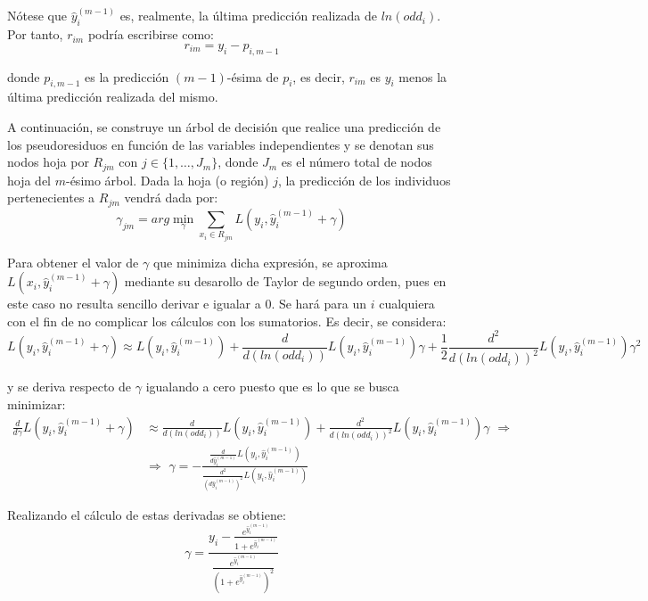 \documentclass[12pt,twoside]{article}
\begin{document}
Nótese que $\hat{y}_i^{(m-1)}$ es, realmente, la última predicción realizada de $ln(odd_i)$. Por tanto, $r_{im}$ podría escribirse como:
\begin{equation*}
r_{im} = y_i - p_{i, m-1}
\end{equation*}

\noindent
donde $p_{i, m-1}$ es la predicción $(m-1)$-ésima de $p_i$, es decir, $r_{im}$ es $y_i$ menos la última predicción realizada del mismo.

A continuación, se construye un árbol de decisión que realice una predicción de los pseudoresiduos en función de las variables independientes y se denotan sus nodos hoja por $R_{jm}$ con $j \in \{1, \dots, J_m \}$, donde $J_m$ es el número total de nodos hoja del $m$-ésimo árbol. Dada la hoja (o región) $j$, la predicción de los individuos pertenecientes a $R_{jm}$ vendrá dada por:
\begin{equation*}
\gamma_{jm} = arg\min_{\gamma} \sum_{x_i \in R_{jm}} L(y_i, \hat{y}_i^{(m-1)} + \gamma)
\end{equation*}

Para obtener el valor de $\gamma$ que minimiza dicha expresión, se aproxima $L(x_i, \hat{y}_i^{(m-1)} + \gamma)$ mediante su desarollo de Taylor de segundo orden, pues en este caso no resulta sencillo derivar e igualar a $0$. Se hará para un $i$ cualquiera con el fin de no complicar los cálculos con los sumatorios. Es decir, se considera:
\begin{equation*}
L(y_i, \hat{y}_i^{(m-1)} + \gamma) \approx L(y_i, \hat{y}_i^{(m-1)}) + \frac{d}{d(ln(odd_i))}L(y_i, \hat{y}_i^{(m-1)})\gamma + \frac{1}{2}\frac{d^2}{d(ln(odd_i))^2}L(y_i, \hat{y}_i^{(m-1)})\gamma^2
\end{equation*}

\noindent
y se deriva respecto de $\gamma$ igualando a cero puesto que es lo que se busca minimizar:
\begin{equation*}
\begin{split}
\frac{d}{d\gamma}L(y_i, \hat{y}_i^{(m-1)} + \gamma) &\approx \frac{d}{d(ln(odd_i))}L(y_i, \hat{y}_i^{(m-1)}) + \frac{d^2}{d(ln(odd_i))^2}L(y_i, \hat{y}_i^{(m-1)})\gamma \, \, \Rightarrow \\
& \Rightarrow \, \, \gamma = - \frac{\frac{d}{d\hat{y}_i^{(m-1)}}L(y_i, \hat{y}_i^{(m-1)})}{\frac{d^2}{(d\hat{y}_i^{(m-1)})^2}L(y_i, \hat{y}_i^{(m-1)})}
\end{split}
\end{equation*}

Realizando el cálculo de estas derivadas se obtiene:
\begin{equation}
\label{eqn:3}
\gamma = \frac{y_i - \frac{e^{\hat{y}_i^{(m-1)}}}{1 + e^{\hat{y}_i^{(m-1)}}}}{\frac{e^{\hat{y}_i^{(m-1)}}}{(1 + e^{\hat{y}_i^{(m-1)}})^2}}
\end{equation}
\end{document}

